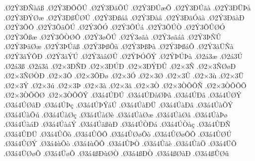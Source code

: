 {.^^d82^^dd3^^d0^^d1^^e0^^e3^^df
.^^d82^^dd3^^d0^^d4^^d5^^da
.^^d82^^dd3^^d0^^e4^^d5^^da
.^^d82^^dd3^^d0^^da^^e6^^d5
.^^d82^^dd3^^d0^^da^^e3^^e0
.^^d82^^dd3^^d0^^dc^^de^^e0
.^^d82^^dd3^^d0^^dd^^d8^^e6
.^^d82^^dd3^^d0^^df^^db^^d8^^da
.^^d82^^dd3^^d0^^df^^e1^^e2
.^^d82^^dd3^^d0^^e0^^e2
.^^d82^^dd3^^d0^^e3^^d3^^e3^^e0
.^^d82^^dd3^^d0^^e3^^e0^^d0
.^^d82^^dd3^^d5^^d4
.^^d82^^dd3^^d5^^e4^^d5^^da
.^^d82^^dd3^^d5^^d3
.^^d82^^dd3^^d5^^da^^e1
.^^d82^^dd3^^d5^^da^^d2
.^^d82^^dd3^^d5^^db^^d8^^d3
.^^d82^^dd3^^d5^^df^^e6
.^^d82^^dd3^^d5^^d2^^d8^^d4
.^^d82^^dd3^^f8^^d5^^da
.^^d82^^dd3^^f8^^e3^^e0
.^^d82^^dd3^^f8^^e3^^e1^^e2
.^^d82^^dd3^^de^^d1^^db
.^^d82^^dd3^^de^^e4^^d8^^e6
.^^d82^^dd3^^de^^da^^e3^^df
.^^d82^^dd3^^de^^df^^d5^^e0
.^^d82^^dd3^^de^^df^^de^^e0
.^^d82^^dd3^^de^^df^^e1^^d5
.^^d82^^dd3^^e3^^dc^^d1^^e0
.^^d82^^dd3^^e3^^dd^^d4^^d0
.^^d82^^dd3^^e3^^dd^^da
.^^d82^^dd3^^e3^^e2^^d8^^db
.^^d82^^dd^^de^^d3^^d5^^dd
.^^d82^^dd^^de^^da^^de^^e0
.^^d82^^e13^^e6
.^^d82^^e13^^da
.^^d82^^e13^^df
.^^d82^^e13^^e2
.^^d82^^d73^^d0^^d1^^d0
.^^d82^^d73^^d0^^da^^d0
.^^d82^^d73^^d0^^dd^^d0^^db
.^^d82^^d73^^d1
.^^d82^^d73^^d1^^d8^^f8^^d0
.^^d82^^d73^^d1^^d8^^d2^^d0
.^^d82^^d73^^d4
.^^d82^^d73^^d4^^d0^^f8
.^^d82^^d73^^d3
.^^d82^^d73^^d8
.^^d82^^d73^^db
.^^d82^^d73^^f9
.^^d82^^d73^^dc
.^^d82^^d73^^dd
.^^d82^^d73^^fa
.^^d82^^d73^^de
.^^d82^^d73^^e0
.^^d82^^d73^^e3
.^^d82^^d73^^d2
.^^d82^^d73^^d2^^d5^^d4^^d1
.^^d82^^d73^^d2^^d5^^d4^^d5
.^^d82^^d73^^d2^^d5^^d4^^d8
.^^d82^^d73^^d2^^d5^^d4^^dd
.^^d83^^e14^^da^^d0^^da
.^^d83^^e14^^da^^d0^^e0^^d8^^de^^e2
.^^d83^^e14^^da^^d0^^e2
.^^d83^^e14^^da^^d8^^dd
.^^d83^^e14^^da^^d8^^e2^^d0
.^^d83^^e14^^da^^de^^e7
.^^d83^^e14^^da^^de^^dd^^e1^^da
.^^d83^^e14^^da^^e0^^d0^^dc
.^^d83^^e14^^da^^e0^^d0^^e2
.^^d83^^e14^^da^^e0^^d5^^dd
.^^d83^^e14^^da^^e0^^d5^^fa
.^^d83^^e14^^da^^e0^^d8^^e7
.^^d83^^e14^^da^^e0^^d8^^e8
.^^d83^^e14^^da^^e0^^d8^^e6
.^^d83^^e14^^da^^e0^^d8^^e2
.^^d83^^e14^^da^^e0^^de^^f8
.^^d83^^e14^^da^^e0^^e1^^d0
.^^d83^^e14^^da^^e0^^e1^^dd
.^^d83^^e14^^da^^e3^^df^^f9^^d0
.^^d83^^e14^^da^^d2^^d0^^e1
.^^d83^^e14^^da^^d2^^e0^^e7
.^^d83^^e14^^db^^d0^^d1
.^^d83^^e14^^db^^d0^^dc
.^^d83^^e14^^db^^d5^^f2
.^^d83^^e14^^db^^d5^^d4
.^^d83^^e14^^db^^d8^^f8^^d5^^f2
.^^d83^^e14^^db^^d8^^f8^^d5^^d4
.^^d83^^e14^^db^^d8^^da
.^^d83^^e14^^db^^d8^^dd
.^^d83^^e14^^f9^^d5^^f2
.^^d83^^e14^^f9^^d5^^d4
.^^d83^^e14^^db^^de^^d2
.^^d83^^e14^^db^^e3^^e8
.^^d83^^e14^^db^^e3^^d6
.^^d83^^e14^^dc^^d5
.^^d83^^e14^^dc^^d8^^f8^^d5
.^^d83^^e14^^dc^^f8^^d5
.^^d83^^e14^^df^^d0^^f9^^d8^^d2
.^^d83^^e14^^df^^d0^^d2
.^^d83^^e14^^df^^d8^^e0^^d0
.^^d83^^e14^^df^^db^^d8^^fb
}
